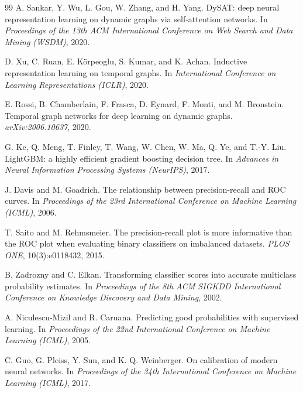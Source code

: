 \documentclass[11pt]{article}
\theoremstyle{definition}
\theoremstyle{remark}
\begin{document}
\begin{thebibliography}{99}
A. Sankar, Y. Wu, L. Gou, W. Zhang, and H. Yang.
DySAT: deep neural representation learning on dynamic graphs via self-attention networks.
In \emph{Proceedings of the 13th ACM International Conference on Web Search and Data Mining (WSDM)}, 2020.

D. Xu, C. Ruan, E. Körpeoglu, S. Kumar, and K. Achan.
Inductive representation learning on temporal graphs.
In \emph{International Conference on Learning Representations (ICLR)}, 2020.

E. Rossi, B. Chamberlain, F. Frasca, D. Eynard, F. Monti, and M. Bronstein.
Temporal graph networks for deep learning on dynamic graphs.
\emph{arXiv:2006.10637}, 2020.

G. Ke, Q. Meng, T. Finley, T. Wang, W. Chen, W. Ma, Q. Ye, and T.-Y. Liu.
LightGBM: a highly efficient gradient boosting decision tree.
In \emph{Advances in Neural Information Processing Systems (NeurIPS)}, 2017.

J. Davis and M. Goadrich.
The relationship between precision-recall and ROC curves.
In \emph{Proceedings of the 23rd International Conference on Machine Learning (ICML)}, 2006.

T. Saito and M. Rehmsmeier.
The precision-recall plot is more informative than the ROC plot when evaluating binary classifiers on imbalanced datasets.
\emph{PLOS ONE}, 10(3):e0118432, 2015.

B. Zadrozny and C. Elkan.
Transforming classifier scores into accurate multiclass probability estimates.
In \emph{Proceedings of the 8th ACM SIGKDD International Conference on Knowledge Discovery and Data Mining}, 2002.

A. Niculescu-Mizil and R. Caruana.
Predicting good probabilities with supervised learning.
In \emph{Proceedings of the 22nd International Conference on Machine Learning (ICML)}, 2005.

C. Guo, G. Pleiss, Y. Sun, and K. Q. Weinberger.
On calibration of modern neural networks.
In \emph{Proceedings of the 34th International Conference on Machine Learning (ICML)}, 2017.

\end{thebibliography}
\end{document}
